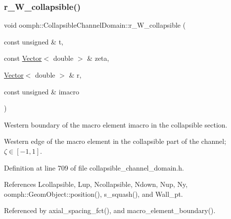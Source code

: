 \mbox{\label{classoomph_1_1CollapsibleChannelDomain_ab8b0f990e596b2725ca8d84f2c9750eb}} 
\subsubsection{\texorpdfstring{r\+\_\+\+W\+\_\+collapsible()}{r\_W\_collapsible()}}
{\footnotesize\ttfamily void oomph\+::\+Collapsible\+Channel\+Domain\+::r\+\_\+\+W\+\_\+collapsible (\begin{DoxyParamCaption}\item[{const unsigned \&}]{t,  }\item[{const \hyperlink{classoomph_1_1Vector}{Vector}$<$ double $>$ \&}]{zeta,  }\item[{\hyperlink{classoomph_1_1Vector}{Vector}$<$ double $>$ \&}]{r,  }\item[{const unsigned \&}]{imacro }\end{DoxyParamCaption})\hspace{0.3cm}{\ttfamily [private]}}



Western boundary of the macro element imacro in the collapsible section. 

Western edge of the macro element in the collapsible part of the channel; $ \zeta \in [-1,1] $. 

Definition at line 709 of file collapsible\+\_\+channel\+\_\+domain.\+h.



References Lcollapsible, Lup, Ncollapsible, Ndown, Nup, Ny, oomph\+::\+Geom\+Object\+::position(), s\+\_\+squash(), and Wall\+\_\+pt.



Referenced by axial\+\_\+spacing\+\_\+fct(), and macro\+\_\+element\+\_\+boundary().

\mbox{\label{classoomph_1_1CollapsibleChannelDomain_a94cebe8b3380c469cfd77924ec57d576}} 
